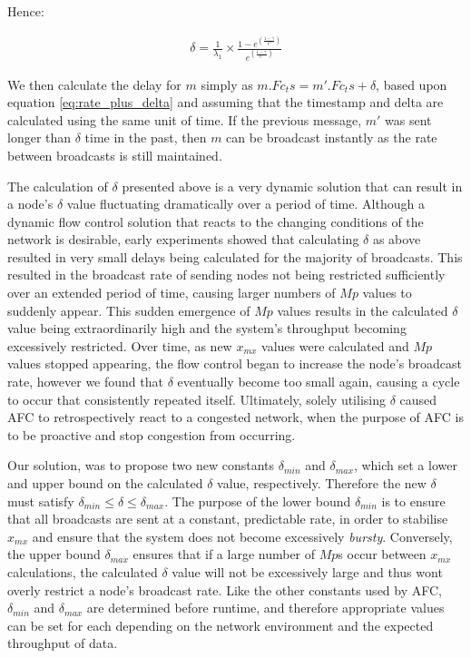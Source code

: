     Hence:
    
        \begin{equation}
		     \begin{aligned}
		         \delta = \frac{1}{\lambda_1}  \times   \frac{1 - e ^{ ({\frac{1-\gamma}{C}})}}{e ^{ ({\frac{1-\gamma}{C}})}}
		     \end{aligned}
    \end{equation}
    
    We then calculate the delay for $m$ simply as $m.Fc_ts = m'.Fc_ts + \delta$, based upon equation \ref{eq:rate_plus_delta} and assuming that the timestamp and delta are calculated using the same unit of time.  If the previous message, $m'$ was sent longer than $\delta$ time in the past, then $m$ can be broadcast instantly as the rate between broadcasts is still maintained.  
    
    The calculation of $\delta$ presented above is a very dynamic solution that can result in a node's $\delta$ value fluctuating dramatically over a period of time.  Although a dynamic flow control solution that reacts to the changing conditions of the network is desirable, early experiments showed that calculating $\delta$ as above resulted in very small delays being calculated for the majority of broadcasts.  This resulted in the broadcast rate of sending nodes not being restricted sufficiently over an extended period of time, causing larger numbers of $Mp$ values to suddenly appear. This sudden emergence of $Mp$ values results in the calculated $\delta$ value being extraordinarily high and the system's throughput becoming excessively restricted.  Over time, as new $x_{mx}$ values were calculated and $Mp$ values stopped appearing, the flow control began to increase the node's broadcast rate, however we found that $\delta$ eventually become too small again, causing a cycle to occur that consistently repeated itself.  Ultimately, solely utilising $\delta$ caused AFC to retrospectively react to a congested network, when the purpose of AFC is to be proactive and stop congestion from occurring.  
    
    Our solution, was to propose two new constants $\delta_{min}$ and $\delta_{max}$, which set a lower and upper bound on the calculated $\delta$ value, respectively.  Therefore the new $\delta$ must satisfy $\delta_{min} \leq \delta \leq \delta_{max}$.  The purpose of the lower bound $\delta_{min}$ is to ensure that all broadcasts are sent at a constant, predictable rate, in order to stabilise $x_{mx}$ and ensure that the system does not become excessively \emph{bursty}.  Conversely, the upper bound $\delta_{max}$ ensures that if a large number of $Mp$s occur between $x_{mx}$ calculations, the calculated $\delta$ value will not be excessively large and thus wont overly restrict a node's broadcast rate.  Like the other constants used by AFC, $\delta_{min}$ and $\delta_{max}$ are determined before runtime, and therefore appropriate values can be set for each depending on the network environment and the expected throughput of data. 

